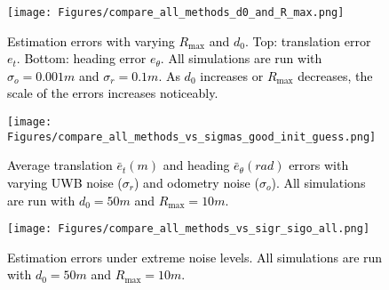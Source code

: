 \documentclass[journal]{IEEEtran}
\begin{document}
\begin{figure*}[t]
\centering
	\texttt{[image: Figures/compare\_all\_methods\_d0\_and\_R\_max.png]}
    \caption{\textcolor{black}{Estimation errors with varying $R_{\max}$ and $d_0$. Top: translation error $e_t$. Bottom: heading error $e_{\theta}$. All simulations are run with $\sigma_o = 0.001\si{m}$ and $\sigma_r = 0.1\si{m}$. As $d_0$ increases or $R_{\max}$ decreases, the scale of the errors increases noticeably.}}
    \label{fig:compare_all_d0_and_Rmax}
\end{figure*}


\begin{figure*}[t]
\centering
	\texttt{[image: Figures/compare\_all\_methods\_vs\_sigmas\_good\_init\_guess.png]}
    \caption{\textcolor{black}{Average translation $\bar{e}_t (\si{m})$ and heading $\bar{e}_{\theta} (\si{rad})$ errors with varying UWB noise ($\sigma_r$) and odometry noise ($\sigma_o$). All simulations are run with $d_0 = 50\si{m}$ and $R_{\max} = 10\si{m}$.}}
    \label{fig:compare_all_sigmas_vs_both_errors}
\end{figure*}
 

\begin{figure}[t]
\centering
	\texttt{[image: Figures/compare\_all\_methods\_vs\_sigr\_sigo\_all.png]}
    \caption{\textcolor{black}{Estimation errors under extreme noise levels. All simulations are run with $d_0 = 50\si{m}$ and $R_{\max} = 10\si{m}$.}}
    \label{fig:compare_all_vs_sigr_sigo}
\end{figure}
\end{document}
